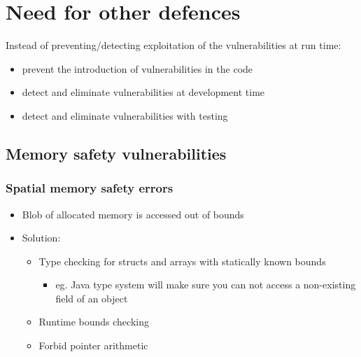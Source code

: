 \documentclass[12pt,titlepage,a4paper]{report}
\begin{document}
		
		\section{Need for other defences}
			Instead of preventing/detecting exploitation of the vulnerabilities at run time:
			\begin{itemize}
				\item prevent the introduction of vulnerabilities in the code
				\item detect and eliminate vulnerabilities at development time
				\item detect and eliminate vulnerabilities with testing
			\end{itemize}

			\subsection{Memory safety vulnerabilities}
				\subsubsection{Spatial memory safety errors}
					\begin{itemize}
						\item Blob of allocated memory is accessed out of bounds
						\item Solution:
						\begin{itemize}
							\item Type checking for structs and arrays with statically known bounds 
							\begin{itemize}
								\item eg. Java type system will make sure you can not access a non-existing field of an object
							\end{itemize}
							\item Runtime bounds checking
							\item Forbid pointer arithmetic
						\end{itemize}
					\end{itemize}
\end{document}
